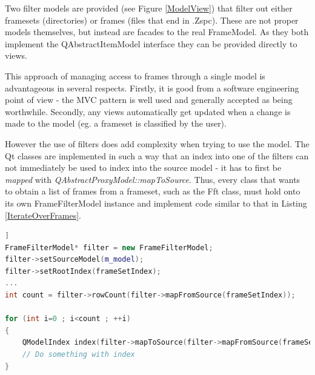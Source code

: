 Two filter models are provided (see Figure \ref{ModelView}) that filter out either framesets (directories) or frames (files that end in .Zspc).
These are not proper models themselves, but instead are facades to the real FrameModel.
As they both implement the QAbstractItemModel interface they can be provided directly to views.

This approach of managing access to frames through a single model is advantageous in several respects.
Firstly, it is good from a software engineering point of view - the MVC pattern is well used and generally accepted as being worthwhile.
Secondly, any views automatically get updated when a change is made to the model (eg. a frameset is classified by the user).

However the use of filters does add complexity when trying to use the model.
The Qt classes are implemented in such a way that an index into one of the filters can not immediately be used to index into the source model - it has to first be \emph{mapped} with \emph{QAbstractProxyModel::mapToSource}.
Thus, every class that wants to obtain a list of frames from a frameset, such as the Fft class, must hold onto its own FrameFilterModel instance and implement code similar to that in Listing \ref{IterateOverFrames}.

\begin{lstlisting}[firstnumber=1,language=c++,frame=single,caption={Code snippet to iterate over the frames in a frameset.},label={IterateOverFrames},float=[htb]]
FrameFilterModel* filter = new FrameFilterModel;
filter->setSourceModel(m_model);
filter->setRootIndex(frameSetIndex);
...
int count = filter->rowCount(filter->mapFromSource(frameSetIndex));

for (int i=0 ; i<count ; ++i)
{
	QModelIndex index(filter->mapToSource(filter->mapFromSource(frameSetIndex).child(i, 0)));
	// Do something with index
}
\end{lstlisting}

